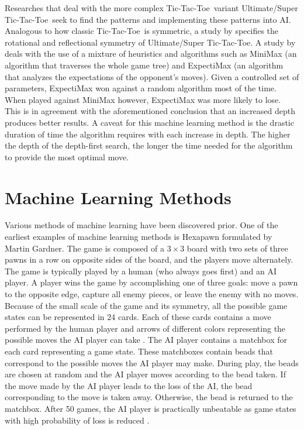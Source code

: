 \documentclass{strrespaper-trad}
\newcommand{\ttt}{Tic-Tac-Toe}
\begin{document}
			Researches that deal with the more complex \ttt\ variant Ultimate/Super \ttt\ seek to find the patterns and implementing these patterns into AI.
			Analogous to how classic \ttt\ is symmetric, a study by \textcite{georgeGroupActionsWinning2016} specifies the rotational and reflectional symmetry of Ultimate/Super \ttt.
			A study by \textcite{lifshitzAIApproachesUltimate} deals with the use of a mixture of heuristics and algorithms such as MiniMax (an algorithm that traverses the whole game tree) and ExpectiMax (an algorithm that analyzes the expectations of the opponent's moves).
			Given a controlled set of parameters, ExpectiMax won against a random algorithm most of the time.
			When played against MiniMax however, ExpectiMax was more likely to lose.
			This is in agreement with the aforementioned conclusion that an increased depth produces better results.
			A caveat for this machine learning method is the drastic duration of time the algorithm requires with each increase in depth.
			The higher the depth of the depth-first search, the longer the time needed for the algorithm to provide the most optimal move.

		\section*{Machine Learning Methods}
			Various methods of machine learning have been discovered prior.
			One of the earliest examples of machine learning methods is Hexapawn formulated by Martin Gardner.
			The game is composed of a $3 \times 3$ board with two sets of three pawns in a row on opposite sides of the board, and the players move alternately.
			The game is typically played by a human (who always goes first) and an AI player.
			A player wins the game by accomplishing one of three goals: move a pawn to the opposite edge, capture all enemy pieces, or leave the enemy with no moves.
			Because of the small scale of the game and its symmetry, all the possible game states can be represented in 24 cards.
			Each of these cards contains a move performed by the human player and arrows of different colors representing the possible moves the AI player can take \autocite{ortizMachineLearningHexapawn2017}.
			The AI player contains a matchbox for each card representing a game state.
			These matchboxes contain beads that correspond to the possible moves the AI player may make.
			During play, the beads are chosen at random and the AI player moves according to the bead taken.
			If the move made by the AI player leads to the loss of the AI, the bead corresponding to the move is taken away.
			Otherwise, the bead is returned to the matchbox.
			After 50 games, the AI player is practically unbeatable as game states with high probability of loss is reduced \autocite{gardnerMathematicalGames1958}.
\end{document}
